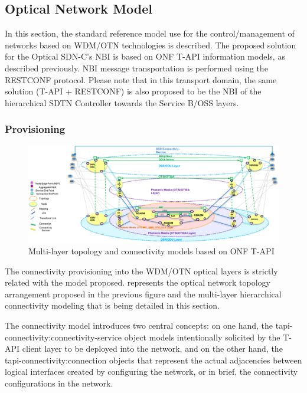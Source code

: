 \documentclass[a4paper,fleqn]{cas-dc}
\begin{document}
\subsection{Optical Network Model}
\label{section:OPTmodels}

In this section, the standard reference model use for the control/management of networks based on WDM/OTN technologies is described. The proposed solution for the Optical SDN-C's NBI is based on ONF T-API information models, as described previously.  NBI message transportation is performed using the RESTCONF protocol. Please note that in this transport domain, the same solution (T-API + RESTCONF) is also proposed to be the NBI of the hierarchical SDTN Controller towards the Service B/OSS layers.

\subsubsection{Provisioning}

\begin{figure}
	\centering
		\includegraphics[scale=0.8]{figs/ONF-T-API.png}
	\caption{Multi-layer topology and connectivity models based on ONF T-API}
	\label{FIG:ONF-T-API}
\end{figure}

The connectivity provisioning into the WDM/OTN optical layers is strictly related with the model proposed.  represents the optical network topology arrangement proposed in the previous figure and the multi-layer hierarchical connectivity modeling that is being detailed in this section.

The connectivity model introduces two central concepts: on one hand, the tapi-connectivity:connectivity-service object models intentionally solicited by the T-API client layer to be deployed into the network, and on the other hand, the tapi-connectivity:connection objects that represent the actual adjacencies between logical interfaces created by configuring the network, or in brief, the connectivity configurations in the network. 
\end{document}
